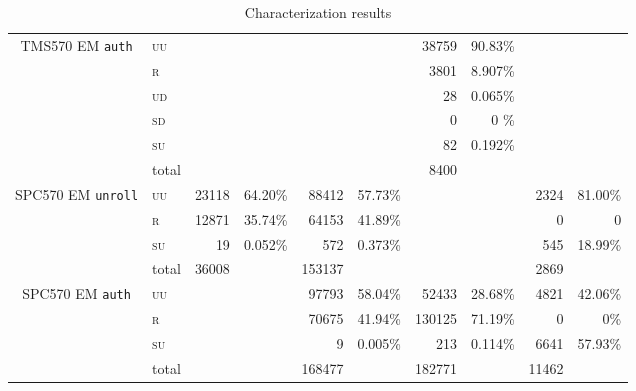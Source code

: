 \documentclass[10pt]{article}
\newcommand{\TI}{TMS570\xspace}
\newcommand{\ST}{SPC570\xspace}
\newcommand{\unroll}{\texttt{unroll}\xspace}
\newcommand{\auth}{\texttt{auth}\xspace}
\newcommand{\UU}{\textsc{uu}\xspace}
\newcommand{\UD}{\textsc{ud}\xspace}
\newcommand{\SU}{\textsc{su}\xspace}
\newcommand{\SD}{\textsc{sd}\xspace}
\newcommand{\R}{\textsc{r}\xspace}
\begin{document}
\begin{table}[H]
\begin{tabular}{ll rr rr rr rr}
    \midrule

    \multicolumn{1}{c}{\multirow{3}{*}{ \parbox{2cm}{\TI EM \auth}}}

    & \UU    
    & & 
    & & 
    & 38759  & 90.83\%  
    & &                            
    \\
    & \R   
    & & 
    & & 
    & 3801   & 8.907\%  
    & &                            
    \\
    & \UD  
    & & 
    & & 
    & 28     & 0.065\%  
    & &                            
    \\
    & \SD     
    & & 
    & & 
    & 0      & 0    \%  
    & &                            
     \\
    & \SU      
    & & 
    & & 
    & 82     & 0.192\%  
    & &                            
    \\

    & total    
    & & 
    & & 
    & 8400   &           
    & &                            
      \\   
   
    \midrule

    \multicolumn{1}{c}{\multirow{3}{*}{ \parbox{2cm}{\ST EM \unroll}}}

    & \UU    
    & 23118  & 64.20\%
    & 88412  & 57.73\%  
    & & 
    & 2324 & 81.00\%                          
    \\
    & \R   
    & 12871  & 35.74\%
    & 64153  & 41.89\%  
    & & 
    & 0 & 0%
    \\
    & \SU      
    & 19     & 0.052\%
    & 572    & 0.373\%  
    & & 
    & 545 & 18.99\%                           
    \\

    & total    
    &  36008  &           
    & 153137 & 
    &  & 
    & 2869&                           
      \\      

    \midrule

    \multicolumn{1}{c}{\multirow{3}{*}{ \parbox{2cm}{\ST EM \auth}}}

    & \UU    
    & & 
    & 97793  & 58.04\%        
    & 52433   & 28.68\%  
    & 4821 &   42.06\%        
    \\
    & \R   
    & & 
    & 70675  & 41.94\%        
    & 130125  & 71.19\%  
    & 0 &       0\%    
    \\
    & \SU      
    & & 
    &  9     & 0.005\%        
    &  213   & 0.114\%  
    & 6641   & 57.93\%           
    \\

    & total    
    & & 
    & 168477  &                 
    & 182771  &          
    & 11462&           
    \\       



    \bottomrule
    \end{tabular}
    \caption{Characterization results}
    \label{tab:all-results}
  \end{table}
\end{document}
